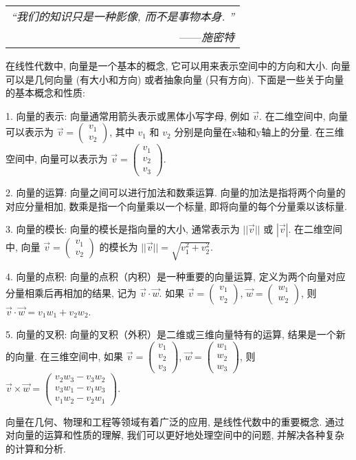 \begin{flushright}
    \begin{tabular}{r||}
        \textit{“我们的知识只是一种影像, 而不是事物本身. ”}\\
        ——\textit{施密特}
    \end{tabular}
\end{flushright}

在线性代数中, 向量是一个基本的概念, 它可以用来表示空间中的方向和大小. 向量可以是几何向量 (有大小和方向) 或者抽象向量 (只有方向). 下面是一些关于向量的基本概念和性质: 

1. 向量的表示: 向量通常用箭头表示或黑体小写字母, 例如 $\vec{v}$. 在二维空间中, 向量可以表示为 $\vec{v} = \begin{pmatrix} v_1 \\ v_2 \end{pmatrix}$, 其中 $v_1$ 和 $v_2$ 分别是向量在x轴和y轴上的分量. 在三维空间中, 向量可以表示为 $\vec{v} = \begin{pmatrix} v_1 \\ v_2 \\ v_3 \end{pmatrix}$. 

2. 向量的运算: 向量之间可以进行加法和数乘运算. 向量的加法是指将两个向量的对应分量相加, 数乘是指一个向量乘以一个标量, 即将向量的每个分量乘以该标量. 

3. 向量的模长: 向量的模长是指向量的大小, 通常表示为 $||\vec{v}||$ 或 $|\vec{v}|$. 在二维空间中, 向量 $\vec{v} = \begin{pmatrix} v_1 \\ v_2 \end{pmatrix}$ 的模长为 $||\vec{v}|| = \sqrt{v_1^2 + v_2^2}$. 

4. 向量的点积: 向量的点积（内积）是一种重要的向量运算, 定义为两个向量对应分量相乘后再相加的结果, 记为 $\vec{v} \cdot \vec{w}$. 如果 $\vec{v} = \begin{pmatrix} v_1 \\ v_2 \end{pmatrix}$, $\vec{w} = \begin{pmatrix} w_1 \\ w_2 \end{pmatrix}$, 则 $\vec{v} \cdot \vec{w} = v_1w_1 + v_2w_2$. 

5. 向量的叉积: 向量的叉积（外积）是二维或三维向量特有的运算, 结果是一个新的向量. 在三维空间中, 如果 $\vec{v} = \begin{pmatrix} v_1 \\ v_2 \\ v_3 \end{pmatrix}$, $\vec{w} = \begin{pmatrix} w_1 \\ w_2 \\ w_3 \end{pmatrix}$, 则 $\vec{v} \times \vec{w} = \begin{pmatrix} v_2w_3 - v_3w_2 \\ v_3w_1 - v_1w_3 \\ v_1w_2 - v_2w_1 \end{pmatrix}$. 

向量在几何、物理和工程等领域有着广泛的应用, 是线性代数中的重要概念. 通过对向量的运算和性质的理解, 我们可以更好地处理空间中的问题, 并解决各种复杂的计算和分析. 
